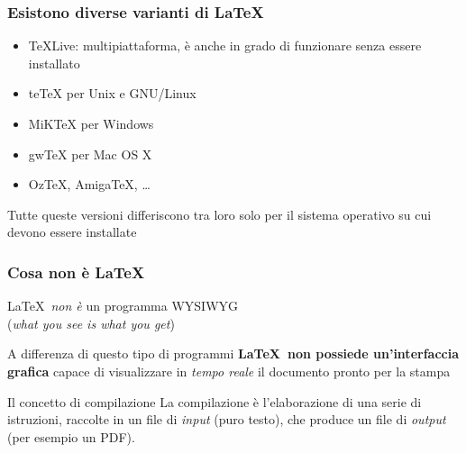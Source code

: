 \documentclass[svgnames,%
	ucs,%
	pdftex]{guitbeamer}
\begin{document}
\begin{frame}
  \frametitle{Esistono diverse varianti di \LaTeX}
	\begin{itemize}
		\item\alert{\TeX Live}: multipiattaforma, \`e anche in grado di
			funzionare senza essere installato
		\item\alert{te\TeX} per Unix e GNU/Linux
		\item\alert{MiK\TeX} per Windows
		\item\alert{gw\TeX} per Mac OS X
		\item\alert{Oz\TeX}, \alert{Amiga\TeX}, \dots
	\end{itemize}
  \bigskip
	Tutte queste versioni differiscono tra loro solo per il sistema
	operativo su cui devono essere installate
\end{frame}

\begin{frame}
  \frametitle{Cosa non \`e \LaTeX}
	\begin{center}
	\LaTeX\ \emph{non \`e} un programma WYSIWYG\\%
	(\textit{what you see is what you get})
	\end{center}
  \bigskip
	A differenza di questo tipo di programmi \textbf{\LaTeX\ non
	possiede un'interfaccia grafica} capace di visualizzare in
	\emph{tempo reale} il documento pronto per la stampa\\
  \bigskip
	\begin{block}{Il concetto di compilazione} 
		La compilazione \`e l'elaborazione di una serie di istruzioni, raccolte in un file di   \emph{input} (puro testo), che produce un file di \emph{output} (per esempio un PDF).
	\end{block}
\end{frame}
\end{document}
